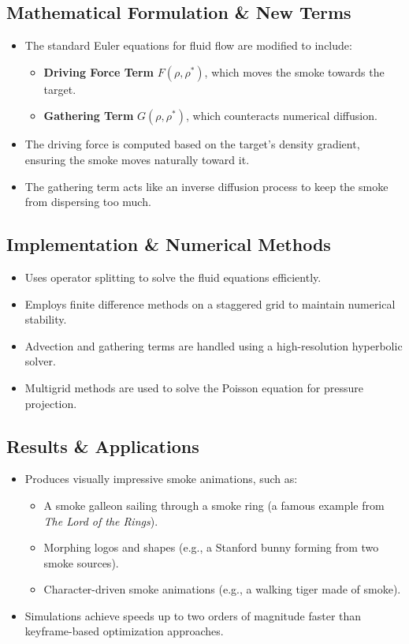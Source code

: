 \documentclass[11pt]{article}
\begin{document}
\subsection{Mathematical Formulation \& New Terms}
\begin{itemize}
    \item The standard Euler equations for fluid flow are modified to include:
    \begin{itemize}
        \item \textbf{Driving Force Term} $F(\rho,\rho^*)$, which moves the smoke towards the target.
        \item \textbf{Gathering Term} $G(\rho,\rho^*)$, which counteracts numerical diffusion.
    \end{itemize}
    \item The driving force is computed based on the target’s density gradient, ensuring the smoke moves naturally toward it.
    \item The gathering term acts like an inverse diffusion process to keep the smoke from dispersing too much.
\end{itemize}

\subsection{Implementation \& Numerical Methods}
\begin{itemize}
    \item Uses operator splitting to solve the fluid equations efficiently.
    \item Employs finite difference methods on a staggered grid to maintain numerical stability.
    \item Advection and gathering terms are handled using a high-resolution hyperbolic solver.
    \item Multigrid methods are used to solve the Poisson equation for pressure projection.
\end{itemize}

\subsection{Results \& Applications}
\begin{itemize}
    \item Produces visually impressive smoke animations, such as:
    \begin{itemize}
        \item A smoke galleon sailing through a smoke ring (a famous example from \emph{The Lord of the Rings}).
        \item Morphing logos and shapes (e.g., a Stanford bunny forming from two smoke sources).
        \item Character-driven smoke animations (e.g., a walking tiger made of smoke).
    \end{itemize}
    \item Simulations achieve speeds up to two orders of magnitude faster than keyframe-based optimization approaches.
\end{itemize}
\end{document}
